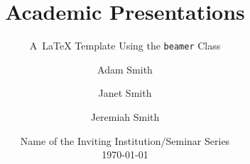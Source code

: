 

\newcommand{\balA}[1][1]{BAL$^\mathup{I}_{#1:#1}$\xspace}
\newcommand{\unbalA}[1][n]{UNBAL$^\mathup{I}_{1:#1}$\xspace}
\newcommand{\balB}[1][1]{BAL$^\mathup{II}_{#1:#1}$\xspace}
\newcommand{\unbalB}[1][n]{UNBAL$^\mathup{II}_{#1:1}$\xspace}


\title[Academic Presentations]{%
	\textbf{%
		Academic Presentations%
	}%
}

\subtitle{A~LaTeX Template Using the \texttt{beamer} Class}


\author[Smith, Smith, and Smith]{%
	Adam Smith \and
	\alert{Janet Smith} \and
	Jeremiah Smith
} %


\date[\the\year]{%
	Name of the Inviting Institution/Seminar Series \\[\medskipamount]
	\textmd{\today}%
}






\begin{frame}[standout]{~}

	\titlepage%

\end{frame}


